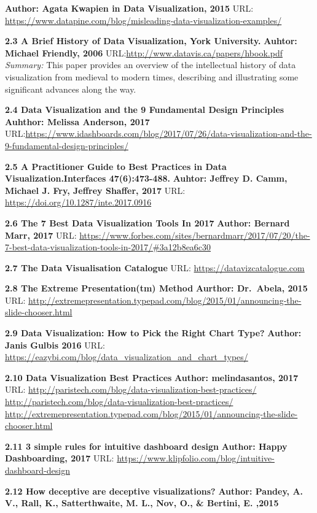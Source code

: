 \documentclass[]{book}
\theoremstyle{definition}
\theoremstyle{definition}
\theoremstyle{definition}
\theoremstyle{remark}
\begin{document}
\textbf{Author: Agata Kwapien in Data Visualization, 2015} URL:
\url{https://www.datapine.com/blog/misleading-data-visualization-examples/}

\textbf{2.3 A Brief History of Data Visualization, York University.}
\textbf{Auhtor: Michael Friendly, 2006}
URL:\url{http://www.datavis.ca/papers/hbook.pdf} \emph{Summary: } This
paper provides an overview of the intellectual history of data
visualization from medieval to modern times, describing and illustrating
some significant advances along the way.

\textbf{2.4 Data Visualization and the 9 Fundamental Design Principles}
\textbf{Auhthor: Melissa Anderson, 2017}
URL:\url{https://www.idashboards.com/blog/2017/07/26/data-visualization-and-the-9-fundamental-design-principles/}

\textbf{2.5 A Practitioner Guide to Best Practices in Data
Visualization.Interfaces 47(6):473-488.} \textbf{Auhtor: Jeffrey D.
Camm, Michael J. Fry, Jeffrey Shaffer, 2017 } URL:
\url{https://doi.org/10.1287/inte.2017.0916}

\textbf{2.6 The 7 Best Data Visualization Tools In 2017} \textbf{Author:
Bernard Marr, 2017} URL:
\url{https://www.forbes.com/sites/bernardmarr/2017/07/20/the-7-best-data-visualization-tools-in-2017/\#3a12b8ea6c30}

\textbf{2.7 The Data Visualisation Catalogue} URL:
\url{https://datavizcatalogue.com}

\textbf{2.8 The Extreme Presentation(tm) Method } \textbf{Aurthor:
Dr.~Abela, 2015 } URL:
\url{http://extremepresentation.typepad.com/blog/2015/01/announcing-the-slide-chooser.html}

\textbf{2.9 Data Visualization: How to Pick the Right Chart Type? }
\textbf{Author: Janis Gulbis 2016 } URL:
\url{https://eazybi.com/blog/data_visualization_and_chart_types/}

\textbf{2.10 Data Visualization Best Practices} \textbf{Author:
melindasantos, 2017} URL:
\url{http://paristech.com/blog/data-visualization-best-practices/}
\url{http://paristech.com/blog/data-visualization-best-practices/}
\url{http://extremepresentation.typepad.com/blog/2015/01/announcing-the-slide-chooser.html}

\textbf{2.11 3 simple rules for intuitive dashboard design}
\textbf{Author: Happy Dashboarding, 2017 } URL:
\url{https://www.klipfolio.com/blog/intuitive-dashboard-design}

\textbf{2.12 How deceptive are deceptive visualizations?}
\textbf{Author: Pandey, A. V., Rall, K., Satterthwaite, M. L., Nov, O.,
\& Bertini, E. ,2015 }
\end{document}
